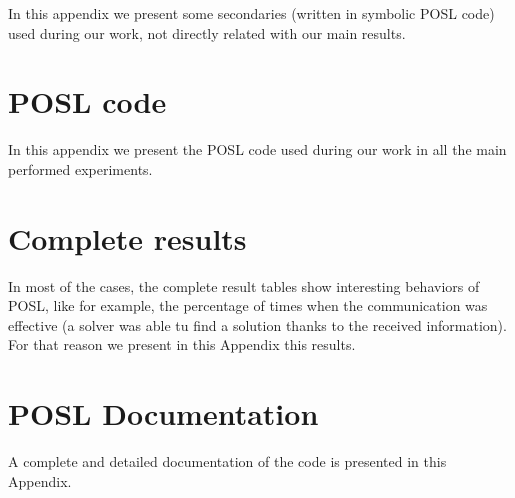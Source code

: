 \documentclass[a4paper]{book} %
\newcommand{\posl}{{\sc POSL}}
\begin{document}
\begin{appendices}
In this appendix we present some secondaries \cstrs{} (written in symbolic \posl{} code) used during our work, not directly related with our main results.

\chapter{\posl{} code}

In this appendix we present the \posl{} code used during our work in all the main performed experiments.

\chapter{Complete results}

In most of the cases, the complete result tables show interesting behaviors of \posl{}, like for example, the percentage of times when the communication was effective (a solver was able tu find a solution thanks to the received information). For that reason we present in this Appendix this results.

\chapter{\posl{} Documentation}

A complete and detailed documentation of the code is presented in this Appendix.

\end{appendices}




%
%
%
%
%
%
%
%
%
%
%
%
\end{document}
